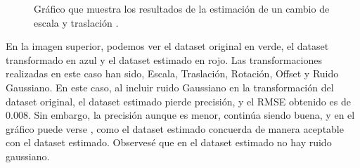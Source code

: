 \begin{figure}
\begin{center}
\hspace{0.5cm}

\end{center}

\caption{Gráfico que muestra los resultados de la estimación de un cambio de escala y traslación .}
\end{figure}

En la imagen superior, podemos ver el dataset original en verde, el dataset transformado en azul y el dataset estimado en rojo.
Las transformaciones realizadas en este caso han sido, Escala, Traslación, Rotación, Offset y Ruido Gaussiano.
En este caso, al incluir ruido Gaussiano en la transformación del dataset original, el dataset estimado pierde precisión, y el RMSE obtenido es de  0.008.
Sin embargo, la precisión aunque es menor, continúa siendo buena, y en el gráfico puede verse , como el dataset estimado concuerda de manera aceptable con el dataset estimado.
Observesé que en el dataset estimado no hay ruido gaussiano.


